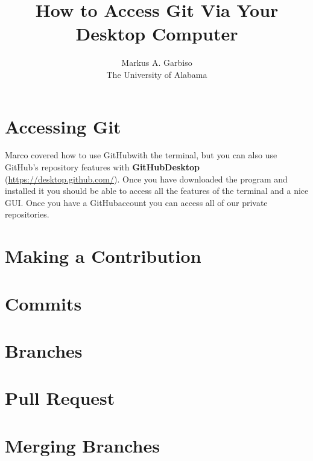 \documentclass{article}
\title{How to Access Git Via Your Desktop Computer} %
\author{Markus A. Garbiso \\ The University of Alabama} %
\newcommand{\gh}{GitHub}
\begin{document}
\maketitle

\section{Accessing Git}

Marco covered how to use \gh with the terminal, but you can also use \gh's repository features with \textbf{\gh Desktop} (\href{https://desktop.github.com/}{https://desktop.github.com/}). Once you have downloaded the program and installed it you should be able to access all the features of the terminal and a nice GUI. Once you have a \gh account you can access all of our private repositories.

\section{Making a Contribution}

\section{Commits}

\section{Branches}

\section{Pull Request}

\section{Merging Branches}
\end{document}
